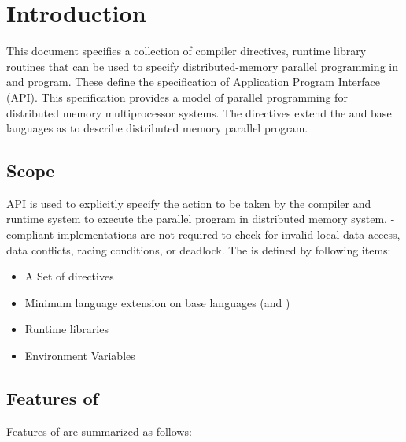
\setvruler[][][][3][0]
\chapter{Introduction}
\setcounter{page}{1}

This document specifies a collection of compiler
directives, runtime library routines that can be used to specify
distributed-memory parallel programming in \C and \Fort
program. These define the specification of \XMP Application
Program Interface (\XMP API). This specification provides a
model of parallel programming for distributed memory multiprocessor
systems. The directives extend the \C and \Fort base languages as to
describe distributed memory parallel program.

\section{Scope}

\XMP API
is used to explicitly specify the action to be taken by the compiler
and runtime system to execute the parallel program in distributed
memory system. \XMP-compliant implementations are not required
to check for invalid local data access, data conflicts, racing
conditions, or deadlock. The \XMP is defined by following items:

\begin{itemize}
\item A Set of directives
\item Minimum language extension on base languages (\C and \Fort)
\item Runtime libraries
\item Environment Variables
\end{itemize}

\section{Features of \XMP}

Features of \XMP are summarized as follows:

